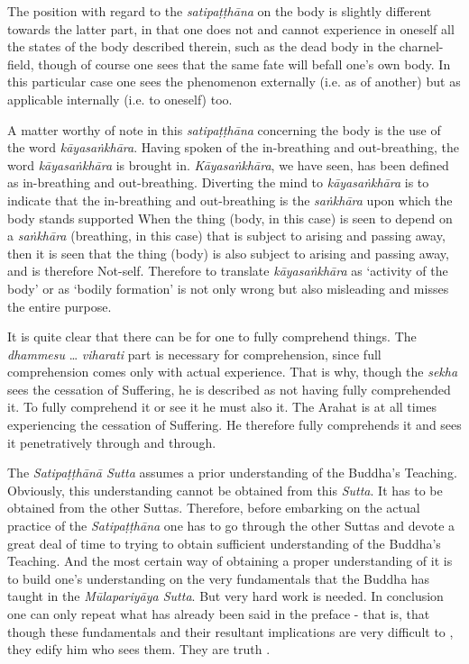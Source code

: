 The position with regard to the \emph{satipaṭṭhāna} on the body is slightly different towards the latter part, in that one does not and cannot experience in oneself all the states of the body described therein, such as the dead body in the charnel-field, though of course one sees that the same fate will befall one's own body. In this particular case one sees the phenomenon externally (i.e. as of another) but as applicable internally (i.e. to oneself) too.

A matter worthy of note in this \emph{satipaṭṭhāna} concerning the body is the use of the word \emph{kāyasaṅkhāra}. Having spoken of the in-breathing and out-breathing, the word \emph{kāyasaṅkhāra} is brought in. \emph{Kāyasaṅkhāra}, we have seen, has been defined as in-breathing and out-breathing. Diverting the mind to \emph{kāyasaṅkhāra} is to indicate that the in-breathing and out-breathing is the \emph{saṅkhāra} upon which the body stands supported When the thing (body, in this case) is seen to depend on a \emph{saṅkhāra} (breathing, in this case) that is subject to arising and passing away, then it is seen that the thing (body) is also subject to arising and passing away, and is therefore Not-self. Therefore to translate \emph{kāyasaṅkhāra} as `activity of the body' or as `bodily formation' is not only wrong but also misleading and misses the entire purpose.

It is quite clear that there can be  for one to fully comprehend things. The \emph{dhammesu} \ldots\hspace{0pt} \emph{viharati} part is necessary for  comprehension, since full comprehension comes only with actual experience. That is why, though the \emph{sekha} sees the cessation of Suffering, he is described as not having fully comprehended it. To fully comprehend it or  see it  he must also  it. The Arahat is at all times experiencing the cessation of Suffering. He therefore fully comprehends it and sees it penetratively through and through.

\protect\hypertarget{truth-for-him}{}{}The \emph{Satipaṭṭhānā Sutta} assumes a prior understanding of the Buddha's Teaching. Obviously, this understanding cannot be obtained from this \emph{Sutta}. It has to be obtained from the other Suttas. Therefore, before embarking on the actual practice of the \emph{Satipaṭṭhāna} one has to go through the other Suttas and devote a great deal of time to trying to obtain sufficient understanding of the Buddha's Teaching. And the most certain way of obtaining a proper understanding of it is to build one's understanding on the very fundamentals that the Buddha has taught in the \emph{Mūlapariyāya Sutta}. But very hard work is needed. In conclusion one can only repeat what has already been said in the preface - that is, that though these fundamentals and their resultant implications are very difficult to , they edify him who sees them. They are truth .
